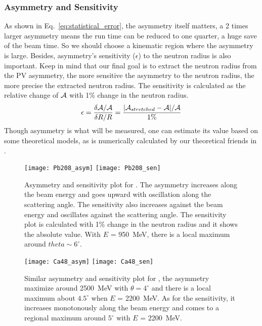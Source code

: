 \subsubsection{Asymmetry and Sensitivity}
As shown in Eq.~\ref{eq:statistical_error}, the asymmetry itself matters,
a 2 times larger asymmetry means the run time can be reduced to one quarter,
a huge save of the beam time. So we should choose a kinematic region where
the asymmetry is large. Besides, asymmetry's sensitivity ($\epsilon$) to the neutron radius 
is also important. Keep in mind that our final goal is to extract the neutron radius
from the PV asymmetry, the more sensitive the asymmetry to the neutron radius, the
more precise the extracted neutron radius. The sensitivity is calculated
as the relative change of $\mathcal{A}$ with 1\% change in the neutron radius.
\begin{equation}
    \epsilon = \frac{\delta \mathcal{A}/\mathcal{A}}{\delta R/R} = \frac{|\mathcal{A}_{stretched} - \mathcal{A}|/\mathcal{A}}{1\%}
\end{equation}
Though asymmetry is what will be measured, one can estimate its value based
on some theoretical models, as is numerically calculated by our theoretical 
friends in \cite{PhysRevC.57.3430}.
\begin{figure}[!h]
    \texttt{[image: Pb208\_asym]}
    \texttt{[image: Pb208\_sen]}
    \caption{Asymmetry and sensitivity plot for \Pb. The asymmetry increases along 
    the beam energy and goes upward with oscillation along the scattering angle. 
    The sensitivity also increases against the beam energy and oscillates against
    the scattering angle.  The sensitivity plot is calculated with 1\% change in 
    the neutron radius and it shows the absolute value.
    With $E$ = 950~MeV, there is a local maximum around $theta \sim 6^\circ$.
    }
\end{figure}
\begin{figure}[h!]
    \texttt{[image: Ca48\_asym]}
    \texttt{[image: Ca48\_sen]}
    \caption{Similar asymmetry and sensitivity plot for \Ca, the asymmetry maximize 
    around 2500~MeV with $\theta = 4^\circ$ and there is a local maximum 
    about $4.5^\circ$ when $E$ = 2200~MeV. As for the sensitivity, it increases
    monotonously along the beam energy and comes to a regional maximum around $5^\circ$
    with $E$ = 2200~MeV.
    }
    \label{fig:ca48_asym_sen}
\end{figure}

